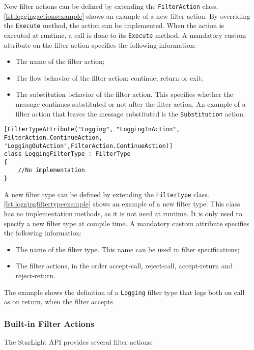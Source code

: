 New filter actions can be defined by extending the \lstinline|FilterAction| class. \autoref{lst:loggingactionsexample} shows an example of a new filter action. By overriding the \lstinline|Execute| method, the action can be implemented. When the action is executed at runtime, a call is done to its \lstinline|Execute| method. A mandatory custom attribute on the filter action specifies the following information:
\begin{itemize}[noitemsep]
\item The name of the filter action;
\item The flow behavior of the filter action: continue, return or exit;
\item The substitution behavior of the filter action. This specifies whether the message continues substituted or not after the filter action. An example of a filter action that leaves the message substituted is the \lstinline|Substitution| action.
\end{itemize}

\begin{lstlisting}[language={[Sharp]C},style=listing,caption={Defining the \expandafter{\lstinline|Logging|} filter type},label={lst:loggingfiltertypeexample}]
[FilterTypeAttribute("Logging", "LoggingInAction", FilterAction.ContinueAction, "LoggingOutAction",FilterAction.ContinueAction)]
class LoggingFilterType : FilterType
{
	//No implementation
}
\end{lstlisting} 
A new filter type can be defined by extending the \lstinline|FilterType| class. \autoref{lst:loggingfiltertypeexample} shows an example of a new filter type. This class has no implementation methods, as it is not used at runtime. It is only used to specify a new filter type at compile time. A mandatory custom attribute specifies the following information:
\begin{itemize}[noitemsep]
\item The name of the filter type. This name can be used in filter specifications;
\item The filter actions, in the order accept-call, reject-call, accept-return and reject-return.
\end{itemize}
The example shows the definition of a \lstinline|Logging| filter type that logs both on call as on return, when the filter accepts.


\subsubsection{Built-in Filter Actions}
The StarLight API provides several filter actions:

